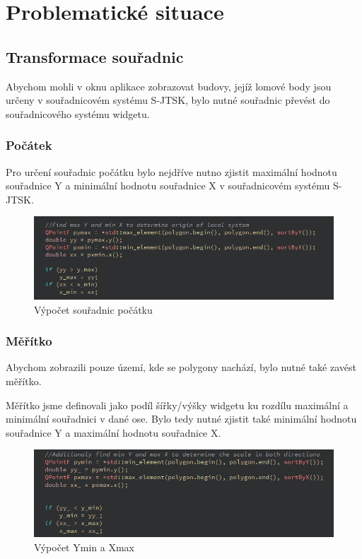 \documentclass[11pt]{article}
\begin{document}
\section{Problematické situace}

\subsection{Transformace souřadnic}
Abychom mohli v oknu aplikace zobrazovat budovy, jejíž lomové body jsou určeny v souřadnicovém systému S-JTSK, bylo nutné souřadnic převést do souřadnicového systému widgetu. 

\subsubsection{Počátek}
Pro určení souřadnic počátku bylo nejdříve nutno zjistit maximální hodnotu souřadnice Y a minimální hodnotu souřadnice X v souřadnicovém systému S-JTSK. 

\begin{figure}[htbh]
	\centering
	\includegraphics[scale=1]{images/U2_problem_pocatek.png} 
	\caption{Výpočet souřadnic počátku}
	\label{fig:problem_origin}
\end{figure} 

\subsubsection{Měřítko}
Abychom zobrazili pouze území, kde se polygony nachází, bylo nutné také zavést měřítko.

Měřítko jsme definovali jako podíl šířky/výšky widgetu ku rozdílu maximální a minimální souřadnici v dané ose. Bylo tedy nutné zjistit také minimální hodnotu souřadnice Y a maximální hodnotu souřadnice X.

\begin{figure}[htbh]
	\centering
	\includegraphics[scale=1]{images/U2_problem_meritko1.png} 
	\caption{Výpočet Ymin a Xmax}
	\label{fig:problem_scale1}
\end{figure} 
\end{document}
